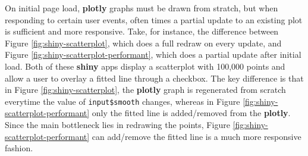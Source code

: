 \documentclass[
  12pt,
]{krantz}
\begin{document}
On initial page load, \textbf{plotly} graphs must be drawn from stratch, but when responding to certain user events, often times a partial update to an existing plot is sufficient and more responsive. Take, for instance, the difference between Figure \ref{fig:shiny-scatterplot}, which does a full redraw on every update, and Figure \ref{fig:shiny-scatterplot-performant}, which does a partial update after initial load. Both of these \textbf{shiny} apps display a scatterplot with 100,000 points and allow a user to overlay a fitted line through a checkbox. The key difference is that in Figure \ref{fig:shiny-scatterplot}, the \textbf{plotly} graph is regenerated from scratch everytime the value of \texttt{input\$smooth} changes, whereas in Figure \ref{fig:shiny-scatterplot-performant} only the fitted line is added/removed from the \textbf{plotly}. Since the main bottleneck lies in redrawing the points, Figure \ref{fig:shiny-scatterplot-performant} can add/remove the fitted line is a much more responsive fashion.

\end{document}
